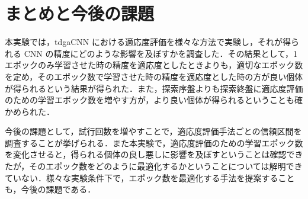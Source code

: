 \documentclass[twocolumn]{jarticle}     %
\begin{document}
\section{まとめと今後の課題}
本実験では，tdgaCNN における適応度評価を様々な方法で実験し，それが得られる CNN の精度にどのような影響を及ぼすかを調査した．その結果として，1 エポックのみ学習させた時の精度を適応度としたときよりも，適切なエポック数を定め，そのエポック数で学習させた時の精度を適応度とした時の方が良い個体が得られるという結果が得られた．また，探索序盤よりも探索終盤に適応度評価のための学習エポック数を増やす方が，より良い個体が得られるということも確かめられた．\par
今後の課題として，試行回数を増やすことで，適応度評価手法ごとの信頼区間を調査することが挙げられる．また本実験で，適応度評価のための学習エポック数を変化させると，得られる個体の良し悪しに影響を及ぼすということは確認できたが，そのエポック数をどのように最適化するかということについては解明できていない．様々な実験条件下で，エポック数を最適化する手法を提案することも，今後の課題である．


\end{document}
